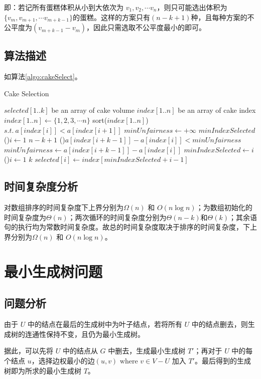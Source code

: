 \documentclass[11pt]{article}
\begin{document}
    即：若记所有蛋糕体积从小到大依次为 $v_1, v_2, \cdots v_n$，则只可能选出体积为$\{v_m, v_{m+1}, \cdots v_{m+k-1}\}$的蛋糕。这样的方案只有$(n-k+1)$种，且每种方案的不公平度为$(v_{m+k-1}-v_m)$，因此只需选取不公平度最小的即可。

\subsection*{算法描述}
如算法\ref{algo:cakeSelect}。
\begin{algorithm}
    \caption{Cake Selection}\label{algo:cakeSelect}
    \Var $selected[1..k]$ be an array of cake volume\;
    \Var $index[1..n]$ be an array of cake index\;
    $index[1..n] \leftarrow \{1, 2, 3, \cdots n\}$\;
    sort($index[1..n]$) $s.t.\ a[index[i]] < a[index[i+1]]$\; 
    \Var $minUnfairness \leftarrow +\infty$\;
    \Var $minIndexSelected$\;
    \For(){$i \leftarrow 1$ \KwTo $n-k+1$}{
        \If(){$a[index[i+k-1]]-a[index[i]] < minUnfairness$}{
            $minUnfairness \leftarrow a[index[i+k-1]]-a[index[i]]$\;
            $minIndexSelected \leftarrow i$\;
        }
    }
    \For(){$i \leftarrow 1$ \KwTo $k$}{
        $selected[i] \leftarrow index[minIndexSelected + i - 1]$\;
    }
\end{algorithm}

\subsection*{时间复杂度分析}
    对数组排序的时间复杂度下上界分别为$\Omega(n)$ 和 $O(n\log n)$；为数组初始化的时间复杂度为$\Theta(n)$；两次循环的时间复杂度分别为$\Theta(n-k)$和$\Theta(k)$；其余语句的执行均为常数时间复杂度。故总的时间复杂度取决于排序的时间复杂度，下上界分别为$\Omega(n)$ 和 $O(n\log n)$。

\section{最小生成树问题}
\subsection*{问题分析}
    由于 $U$ 中的结点在最后的生成树中为叶子结点，若将所有 $U$ 中的结点删去，则生成树的连通性保持不变，且仍为最小生成树。

    据此，可以先将 $U$ 中的结点从 $G$ 中删去，生成最小生成树 $T'$；再对于 $U$ 中的每个结点 $u$，选择边权最小的边$(u, v) \text{ where } v\in V-U$ 加入 $T'$。最后得到的生成树即为所求的最小生成树 $T$。
\end{document}
